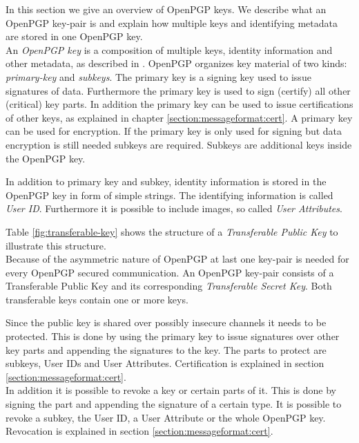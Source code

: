 In this section we give an overview of OpenPGP keys. We describe what an OpenPGP key-pair is and explain how multiple keys and identifying metadata are stored in one OpenPGP key. \\

An \textit{OpenPGP key} is a composition of multiple keys, identity information and other metadata, as described in  \cite[section 11.1]{RFC4880}. OpenPGP organizes key material of two kinds: \textit{primary-key} and \textit{subkeys}. The primary key is a signing key used to issue signatures of data. Furthermore the primary key is used to sign (certify) all other (critical) key parts. In addition the primary key can be used to issue certifications of other keys, as explained in chapter \ref{section:messageformat:cert}. A primary key can be used for encryption. If the primary key is only used for  signing but data encryption is still needed subkeys are required. Subkeys are additional keys inside the OpenPGP key. 

In addition to primary key and subkey, identity information is stored in the OpenPGP key in form of simple strings. The identifying information is called \textit{User ID}. Furthermore it is possible to include images, so called \textit{User Attributes}. 

Table \ref{fig:transferable-key} shows the structure of a \textit{Transferable Public Key} to illustrate this structure. \\

Because of the  asymmetric nature of OpenPGP at last one key-pair is needed for every OpenPGP secured communication. An OpenPGP key-pair consists of a Transferable Public Key and its corresponding \textit{Transferable Secret Key}. Both transferable keys contain one or more keys. 


Since the public key is shared over possibly insecure channels it needs to be protected. This is done by using the primary key to issue signatures over other key parts and appending the signatures to the key. The parts to protect are subkeys, User IDs and User Attributes. Certification is explained in section \ref{section:messageformat:cert}. \\


In addition it is possible to revoke a key or certain parts of it. This is done by signing the part and appending the signature of a certain type. It is possible to revoke a subkey, the User ID, a User Attribute or the whole OpenPGP key. Revocation is explained in section \ref{section:messageformat:cert}.

